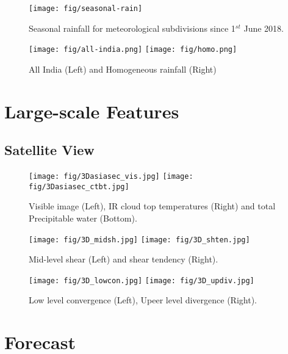 \documentclass[10pt,a4paper]{article} %
\begin{document}
\begin{figure}[H]
\centering
\texttt{[image: fig/seasonal-rain]}
\caption{Seasonal rainfall for meteorological subdivisions since 1$^{st}$ June 2018.}
\end{figure}



\begin{figure}[H]
\centering
\texttt{[image: fig/all-india.png]}
\texttt{[image: fig/homo.png]}
\caption{All India  (Left) and Homogeneous rainfall (Right)}
\end{figure}


\section{Large-scale Features}


\subsection{Satellite View}

\begin{figure}[H]
\centering
\texttt{[image: fig/3Dasiasec\_vis.jpg]}
\texttt{[image: fig/3Dasiasec\_ctbt.jpg]}\\
\caption{Visible image (Left), IR cloud top temperatures (Right) and total Precipitable water (Bottom).}
\end{figure}

\begin{figure}[H]
\centering
\texttt{[image: fig/3D\_midsh.jpg]}
\texttt{[image: fig/3D\_shten.jpg]}
\caption{Mid-level shear (Left) and shear tendency (Right).}
\end{figure}


\begin{figure}[H]
\centering
\texttt{[image: fig/3D\_lowcon.jpg]}
\texttt{[image: fig/3D\_updiv.jpg]}

\caption{Low level convergence (Left), Upeer level divergence  (Right).}
\end{figure}

\section{Forecast}
\end{document}
